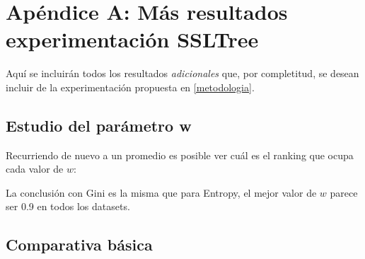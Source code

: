 

\chapter{Apéndice A: Más resultados experimentación SSLTree}
\label{resultados-experimentación}

Aquí se incluirán todos los resultados \textit{adicionales} que, por completitud, se desean incluir de la experimentación propuesta en \ref{metodologia}.

\section{Estudio del parámetro w}


Recurriendo de nuevo a un promedio es posible ver cuál es el ranking que ocupa cada valor de $w$:

\begin{table}[h]
\caption{Ranking promedio de cada valor de $w$ (Gini)}
\label{tab:ranking-w-gini}
\end{table}

La conclusión con Gini es la misma que para Entropy, el mejor valor de $w$ parece ser 0.9 en todos los datasets.

\section{Comparativa básica}

